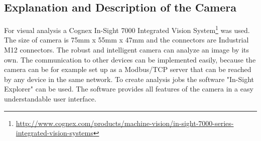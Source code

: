 \documentclass[a4paper]{spie}  %
\begin{document}
\begin{large}
\subsection{Explanation and Description of the Camera}
For visual analysis a Cognex In-Sight 7000 Integrated Vision System\footnote{\url{http://www.cognex.com/products/machine-vision/in-sight-7000-series-integrated-vision-systems}} was used. The size of camera is 75mm x 55mm
x 47mm and the connectors are Industrial M12 connectors. The robust and intelligent camera can analyze an image by its own. The communication to other devices can be implemented easily, because the camera can be for example set up as a Modbus/TCP server that can be reached by any device in the same network. To create analysis jobs the software "In-Sight Explorer" can be used. The software provides all features of the camera in a easy understandable user interface.

\end{large}
\end{document}
